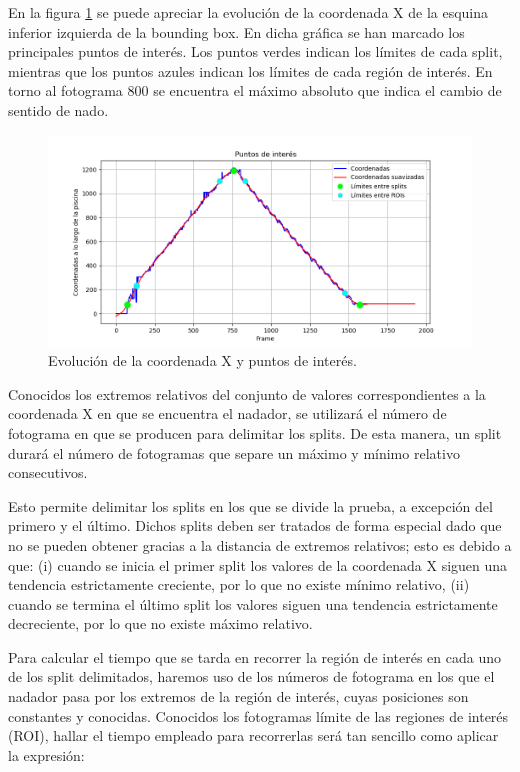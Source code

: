 En la figura \ref{fig:ejemplocoordenadasX} se puede apreciar la evolución de la coordenada X de la esquina inferior izquierda de la bounding box. En dicha gráfica se han marcado los principales puntos de interés. Los puntos verdes indican los límites de cada split, mientras que los puntos azules indican los límites de cada región de interés. En torno al fotograma 800 se encuentra el máximo absoluto que indica el cambio de sentido de nado. 


\begin{figure}
   \centering
   \includegraphics[width=\textwidth,height=\textheight,keepaspectratio]{imagenes/parte_graficas/SENTID.png}
   \caption{Evolución de la coordenada X y puntos de interés.}
   \label{fig:ejemplocoordenadasX}
\end{figure}

Conocidos los extremos relativos del conjunto de valores correspondientes a la coordenada X en que se encuentra el nadador, se utilizará el número de fotograma en que se producen para delimitar los splits. De esta manera, un split durará el número de fotogramas que separe un máximo y mínimo relativo consecutivos.

Esto permite delimitar los splits en los que se divide la prueba, a excepción del primero y el último. Dichos splits deben ser tratados de forma especial dado que no se pueden obtener gracias a la distancia de extremos relativos; esto es debido a que: (i) cuando se inicia el primer split los valores de la coordenada X siguen una tendencia estrictamente creciente, por lo que no existe mínimo relativo, (ii) cuando se termina el último split los valores siguen una tendencia estrictamente decreciente, por lo que no existe máximo relativo.

Para calcular el tiempo que se tarda en recorrer la región de interés en cada uno de los split delimitados, haremos uso de los números de fotograma en los que el nadador pasa por los extremos de la región de interés, cuyas posiciones son constantes y conocidas. Conocidos los fotogramas límite de las regiones de interés (ROI), hallar el tiempo empleado para recorrerlas será tan sencillo como aplicar la expresión: 

